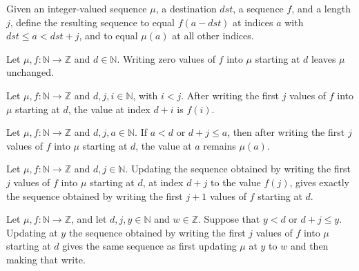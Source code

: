 \begin{definition}
\label{Light.wrote}
\leanok
Given an integer-valued sequence $\mu$, a destination $dst$, a sequence $f$, and a
length $j$, define the resulting sequence to equal $f(a-dst)$ at indices $a$ with
$dst\le a<dst+j$, and to equal $\mu(a)$ at all other indices.
\end{definition}

\begin{theorem}
\label{Light.wrote_zero}
\leanok
{}
Let $\mu,f:\mathbb{N}\to\mathbb{Z}$ and $d\in\mathbb{N}$. Writing zero values of $f$
into $\mu$ starting at $d$ leaves $\mu$ unchanged.
\end{theorem}

\begin{theorem}
\label{Light.wrote_done}
\leanok
{}
Let $\mu,f:\mathbb{N}\to\mathbb{Z}$ and $d,j,i\in\mathbb{N}$, with $i<j$. After writing
the first $j$ values of $f$ into $\mu$ starting at $d$, the value at index $d+i$ is
$f(i)$.
\end{theorem}

\begin{theorem}
\label{Light.wrote_rest}
\leanok
{}
Let $\mu,f:\mathbb{N}\to\mathbb{Z}$ and $d,j,a\in\mathbb{N}$. If $a<d$ or $d+j\le a$,
then after writing the first $j$ values of $f$ into $\mu$ starting at $d$, the value at
$a$ remains $\mu(a)$.
\end{theorem}

\begin{theorem}
\label{Light.wrote_succ}
\leanok
{}
Let $\mu,f:\mathbb{N}\to\mathbb{Z}$ and $d,j\in\mathbb{N}$. Updating the sequence
obtained by writing the first $j$ values of $f$ into $\mu$ starting at $d$, at index
$d+j$ to the value $f(j)$, gives exactly the sequence obtained by writing the first
$j+1$ values of $f$ starting at $d$.
\end{theorem}

\begin{theorem}
\label{Light.update_wrote}
\leanok
{}
Let $\mu,f:\mathbb{N}\to\mathbb{Z}$, and let $d,j,y\in\mathbb{N}$ and $w\in\mathbb{Z}$.
Suppose that $y<d$ or $d+j\le y$. Updating at $y$ the sequence obtained by writing the
first $j$ values of $f$ into $\mu$ starting at $d$ gives the same sequence as first
updating $\mu$ at $y$ to $w$ and then making that write.
\end{theorem}


